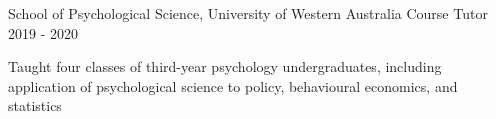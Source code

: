 \begin{cventries}
  \cventry
    {School of Psychological Science, University of Western Australia} %
    {Course Tutor} %
    {}%
    {2019 - 2020} %
    { %
      \begin{cvitems}
        \item Taught four classes of third-year psychology undergraduates, including application of psychological science to policy, behavioural economics, and statistics
      \end{cvitems}
    }
    
\end{cventries}

